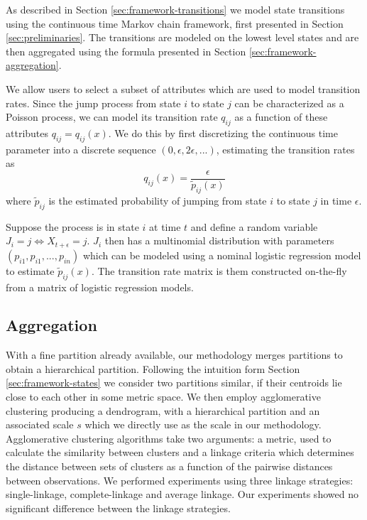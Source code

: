 As described in Section \ref{sec:framework-transitions} we model state transitions using the continuous
time Markov chain framework, first presented in Section \ref{sec:preliminaries}. The transitions are 
modeled on the lowest level states and are then aggregated using the formula presented in Section \ref{sec:framework-aggregation}.

We allow users to select a subset of attributes which are used to model transition rates. Since the
jump process from state $i$ to state $j$ can be characterized as a Poisson process, we can model its
transition rate $q_{ij}$ as a function of these attributes $q_{ij} = q_{ij}(x)$. We do this by first
discretizing the continuous time parameter into a discrete sequence $(0, \epsilon, 2\epsilon, ...)$,
estimating the transition rates as
\begin{equation}
	q_{ij}(x) = \frac{\epsilon}{\tilde{p}_{ij}(x)}
\end{equation}
where $\tilde{p}_{ij}$ is the estimated probability of jumping from state $i$ to state $j$ in time
$\epsilon$.

Suppose the process is in state $i$ at time $t$ and define a random variable $J_i = j \Leftrightarrow X_{t + \epsilon} = j$.
$J_i$ then has a multinomial distribution with parameters $(p_{i1}, p_{i1}, ..., p_{in})$ which can be 
modeled using a nominal logistic regression model \cite{glm-introduction} to estimate $\tilde{p}_{ij}(x)$.
The transition rate matrix is them constructed on-the-fly from a matrix of logistic regression models.

\subsection{Aggregation}
\label{sec:state-aggregation-impl}

With a fine partition already available, our methodology merges partitions to obtain a hierarchical partition.
Following the intuition form Section \ref{sec:framework-states} we consider two partitions similar, if their
centroids lie close to each other in some metric space.  We then employ agglomerative clustering \cite{Murtagh83}
producing a dendrogram, with a hierarchical partition and an associated scale $s$ which we directly use
as the scale in our methodology.
Agglomerative clustering algorithms take two arguments: a metric, used to calculate the similarity between 
clusters and a linkage criteria which determines the distance between sets of clusters as a function of the
pairwise distances between observations. We performed experiments using three linkage strategies: single-linkage, 
complete-linkage and average linkage. Our experiments showed no significant difference between the linkage strategies.

